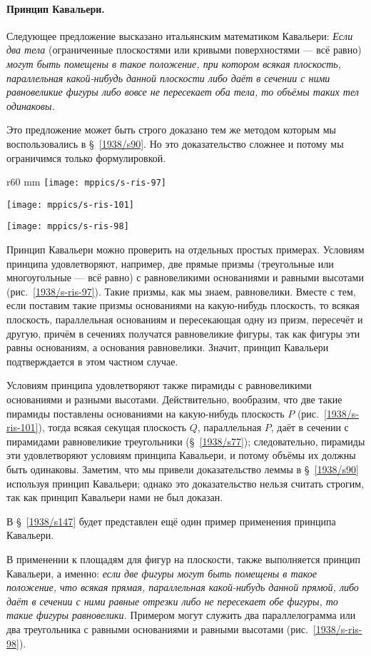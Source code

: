 {\paragraph{Принцип Кавальери.}\label{1938/s89} 
Следующее предложение высказано итальянским математиком Кавальери:
\emph{Если два тела} (ограниченные плоскостями или кривыми поверхностями — всё равно) \emph{могут быть помещены в такое положение, при котором всякая плоскость, параллельная какой-нибудь данной плоскости либо даёт в сечении с ними равновеликие фигуры либо вовсе не пересекает оба тела, то объёмы таких тел одинаковы.}

Это предложение может быть строго доказано тем же методом которым мы воспользовались в §~\ref{1938/s90}.
Но это доказательство сложнее и потому мы ограничимся только формулировкой.

\begin{wrapfigure}{r}{60 mm}
\vskip-0mm
\centering
\texttt{[image: mppics/s-ris-97]}
\caption{}\label{1938/s-ris-97}
\bigskip
\texttt{[image: mppics/s-ris-101]}
\caption{}\label{1938/s-ris-101}%
\bigskip
\texttt{[image: mppics/s-ris-98]}
\caption{}\label{1938/s-ris-98}
\end{wrapfigure}

Принцип Кавальери можно проверить на отдельных простых примерах.
Условиям принципа удовлетворяют, например, две прямые призмы (треугольные или многоугольные — всё равно) с равновеликими основаниями и равными высотами (рис.~\ref{1938/s-ris-97}).
Такие призмы, как мы знаем, равновелики.
Вместе с тем, если поставим такие призмы основаниями на какую-нибудь плоскость, то всякая плоскость, параллельная основаниям и пересекающая одну из призм, пересечёт и другую, причём в сечениях получатся равновеликие фигуры, так как фигуры эти равны основаниям, а основания равновелики.
Значит, принцип Кавальери подтверждается в этом частном случае.

Условиям принципа удовлетворяют также пирамиды с равновеликими основаниями и разными высотами.
Действительно, вообразим, что две такие пирамиды поставлены основаниями на какую-нибудь плоскость $P$ (рис.~\ref{1938/s-ris-101}), тогда всякая секущая плоскость $Q$, параллельная $P$, даёт в сечении с пирамидами равновеликие треугольники (§~\ref{1938/s77});
следовательно, пирамиды эти удовлетворяют условиям принципа Кавальери, и потому объёмы их должны быть одинаковы.
Заметим, что мы привели доказательство леммы в §~\ref{1938/s90} используя принцип Кавальери;
однако это доказательство нельзя считать строгим, так как принцип Кавальери нами не был доказан.

В §~\ref{1938/s147} будет представлен ещё один пример применения принципа Кавальери.

В применении к площадям для фигур на плоскости, также выполняется принцип Кавальери, а именно: 
\emph{если две фигуры могут быть помещены в такое положение, что всякая прямая, параллельная какой-нибудь данной прямой, либо даёт в сечении с ними равные отрезки либо не пересекает обе фигуры, то такие фигуры равновелики.}
Примером могут служить два параллелограмма или два треугольника с равными основаниями и равными высотами (рис.~\ref{1938/s-ris-98}).

}

